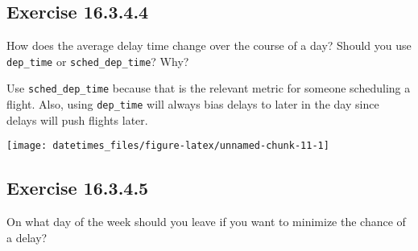 \documentclass[]{book}
\newenvironment{Shaded}{\begin{snugshade}}{\end{snugshade}}
\newcommand{\CommentTok}[1]{\textcolor[rgb]{0.56,0.35,0.01}{\textit{#1}}}
\newcommand{\DataTypeTok}[1]{\textcolor[rgb]{0.13,0.29,0.53}{#1}}
\newcommand{\KeywordTok}[1]{\textcolor[rgb]{0.13,0.29,0.53}{\textbf{#1}}}
\newcommand{\NormalTok}[1]{#1}
\newcommand{\OperatorTok}[1]{\textcolor[rgb]{0.81,0.36,0.00}{\textbf{#1}}}
\newcommand{\StringTok}[1]{\textcolor[rgb]{0.31,0.60,0.02}{#1}}
\theoremstyle{plain}
\theoremstyle{remark}
\begin{document}
\hypertarget{exercise-16.3.4.4}{%
\subsection*{\texorpdfstring{Exercise
{16.3.4.4}}{Exercise 16.3.4.4}}\label{exercise-16.3.4.4}}

How does the average delay time change over the course of a day? Should
you use \texttt{dep\_time} or \texttt{sched\_dep\_time}? Why?

Use \texttt{sched\_dep\_time} because that is the relevant metric for
someone scheduling a flight. Also, using \texttt{dep\_time} will always
bias delays to later in the day since delays will push flights later.

\begin{Shaded}
\end{Shaded}

\begin{center}\texttt{[image: datetimes\_files/figure-latex/unnamed-chunk-11-1]} \end{center}

\hypertarget{exercise-16.3.4.5}{%
\subsection*{\texorpdfstring{Exercise
{16.3.4.5}}{Exercise 16.3.4.5}}\label{exercise-16.3.4.5}}

On what day of the week should you leave if you want to minimize the
chance of a delay?
\end{document}
